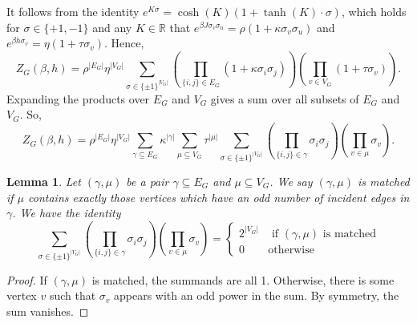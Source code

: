 \documentclass{article}
\numberwithin{theorem}{section}
\newtheorem{lemma}[theorem]{Lemma}
\theoremstyle{remark}
\newcommand{\RR}{\mathbb{R}}
\begin{document}
It follows from the identity $e^{K \sigma} = \cosh(K) (1 + \tanh(K) \cdot \sigma)$, which holds for $\sigma \in \{+1, -1\}$ and any $K \in \RR$ that 
$
    e^{\beta J \sigma_v \sigma_u} = \rho (1 + \kappa \sigma_v \sigma_u)$  and 
    $e^{\beta h \sigma_v} = \eta (1 + \tau \sigma_v).
$
Hence, 
\begin{equation}
\label{eq:ZGkappaeta}
    Z_G(\beta,h) = \rho^{|E_G|} \eta^{|V_G|} 
\sum_{\sigma\in \{\pm 1\}^{|V_G|}} 
\left( \prod_{\{i, j\} \in E_G} (1 + \kappa \sigma_i \sigma_j) \right) \left( \prod_{v \in V_G} (1 + \tau \sigma_{v}) \right).
\end{equation}
Expanding the products over $E_G$ and $V_G$ gives a sum over all subsets of $E_G$ and $V_G$. So,
\begin{equation}
\label{eq:ZGlong}
    Z_G(\beta,h) = \rho^{|E_G|} \eta^{|V_G|} 
\sum_{\gamma \subseteq E_G} 
\kappa^{|\gamma|}
\sum_{\mu \subseteq V_G}
\tau^{|\mu|}
\sum_{\sigma\in \{\pm 1\}^{|V_G|}} 
\left( \prod_{\{i, j\} \in \gamma} \sigma_i \sigma_j \right) \left( \prod_{v \in \mu} \sigma_{v} \right).
\end{equation}
\begin{lemma}
\label{lmm:evenodd}
Let $(\gamma, \mu)$ be a pair $\gamma \subseteq E_G$ and $\mu \subseteq V_G$.
We say $(\gamma, \mu)$ is matched if $\mu$ contains exactly those vertices which have an odd number of incident edges in $\gamma$.
We have the identity
\[
\sum_{\sigma\in \{\pm 1\}^{|V_G|}} 
\left( \prod_{\{i, j\} \in \gamma} \sigma_i \sigma_j \right) \left( \prod_{v \in \mu} \sigma_{v} \right)
=
\begin{cases}
2^{|V_G|} & \text{ if $(\gamma, \mu)$ is matched} \\
0 & \text{otherwise}
\end{cases}
\]
\end{lemma}
\begin{proof}
If $(\gamma, \mu)$ is matched, the summands are all 1. Otherwise, 
there is some vertex $v$ such that $\sigma_v$ appears with an odd power in the sum.
By symmetry, the sum vanishes.
\end{proof}
\end{document}
